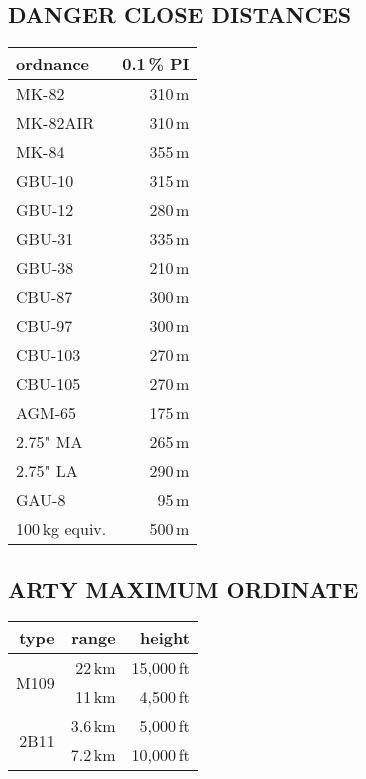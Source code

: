 \documentclass[
  7pt,
  headinclude=false,
  footinclude=false,
  portrait,
  paper=15cm:10cm,
  twocolumn,
]{scrartcl}
\begin{document}
\subsection*{DANGER CLOSE DISTANCES}
\begin{tabular}{@{}lr@{}} \toprule
  ordnance       & 0.1\,\% PI \\ \midrule
  MK-82          & 310\,m \\
  MK-82AIR       & 310\,m \\
  MK-84          & 355\,m \\ \midrule
  GBU-10         & 315\,m \\
  GBU-12         & 280\,m \\
  GBU-31         & 335\,m \\
  GBU-38         & 210\,m \\ \midrule
  CBU-87         & 300\,m \\
  CBU-97         & 300\,m \\
  CBU-103        & 270\,m \\
  CBU-105        & 270\,m \\ \midrule
  AGM-65         & 175\,m \\
  2.75" MA       & 265\,m \\
  2.75" LA       & 290\,m \\
  GAU-8          &  95\,m \\ \midrule
  100\,kg equiv. & 500\,m \\ \bottomrule
\end{tabular}

\subsection*{ARTY MAXIMUM ORDINATE}
\begin{tabular}{@{}rrr@{}} \toprule
  type & range   & height \\ \midrule
  \multirow{2}{*}{M109} 
       &  22\,km & 15,000\,ft \\
       &  11\,km &  4,500\,ft \\ \midrule
  \multirow{2}{*}{2B11} 
       & 3.6\,km &  5,000\,ft \\
       & 7.2\,km & 10,000\,ft \\ \bottomrule
\end{tabular}
\end{document}
